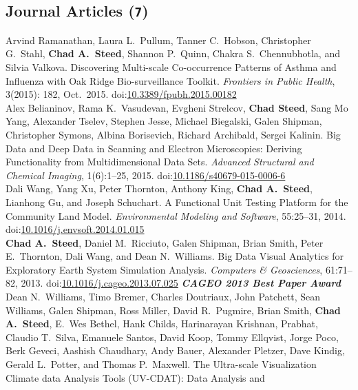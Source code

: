\documentclass[11pt, letterpaper]{article}
\newcommand{\amper}{{\fontspec[Scale=.95]{Hoefler Text}\selectfont\itshape\&}}
\newcommand{\years}[1]{\marginnote{\scriptsize #1}}
\begin{document}
\subsection*{Journal Articles (\texttt{7})}
\begin{sloppypar}
\noindent\years{2015}Arvind Ramanathan, Laura L.\ Pullum, Tanner C.\ Hobson,
Christopher G.\ Stahl, \textbf{Chad A.\ Steed}, Shannon P.\ Quinn,
Chakra S.\ Chennubhotla, and Silvia Valkova.  Discovering Multi-scale
Co-occurrence Patterns of Asthma and Influenza with Oak Ridge Bio-surveillance
Toolkit. \emph{Frontiers in Public Health}, 3(2015): 182, Oct.\ 2015.
doi:\href{http://dx.doi.org/10.3389/fpubh.2015.00182}
{10.3389/fpubh.2015.00182}\\
\years{2015}Alex Belianinov, Rama K.\ Vasudevan, Evgheni Strelcov,
\textbf{Chad Steed}, Sang Mo Yang, Alexander Tselev, Stephen Jesse,
Michael Biegalski, Galen Shipman, Christopher Symons, Albina Borisevich,
Richard Archibald, Sergei Kalinin.  Big Data and Deep Data in Scanning
and Electron Microscopies: Deriving Functionality from Multidimensional Data
Sets. \emph{Advanced Structural and Chemical Imaging}, 1(6):1--25, 2015.
doi:\href{http://dx.doi.org/10.1186/s40679-015-0006-6}
{10.1186/s40679-015-0006-6}\\
\years{2014}Dali Wang, Yang Xu, Peter Thornton, Anthony King,
\textbf{Chad A.\ Steed}, Lianhong Gu, and Joseph Schuchart.
A Functional Unit Testing Platform for the Community Land Model.
\emph{Environmental Modeling and Software}, 55:25--31, 2014.
doi:\href{http://dx.doi.org/10.1016/j.envsoft.2014.01.015}
{10.1016/j.envsoft.2014.01.015}\\
\years{2013}\textbf{Chad A.\ Steed}, Daniel M.\ Ricciuto, Galen Shipman,
Brian Smith, Peter E.\ Thornton, Dali Wang, and Dean N.\ Williams.
Big Data Visual Analytics for Exploratory Earth System Simulation Analysis.
\emph{Computers \amper{} Geosciences}, 61:71--82, 2013.
doi:\href{http://dx.doi.org/10.1016/j.cageo.2013.07.025}
{10.1016/j.cageo.2013.07.025}
\textbf{\emph{CAGEO 2013 Best Paper Award}}\\
\years{2013}Dean N.\ Williams, Timo Bremer, Charles Doutriaux, John Patchett,
Sean Williams, Galen Shipman, Ross Miller, David R.\ Pugmire, Brian Smith,
\textbf{Chad A.\ Steed}, E.\ Wes Bethel, Hank Childs, Harinarayan Krishnan,
Prabhat, Claudio T.\ Silva, Emanuele Santos, David Koop, Tommy Ellqvist,
Jorge Poco, Berk Geveci, Aashish Chaudhary, Andy Bauer, Alexander Pletzer,
Dave Kindig, Gerald L.\ Potter, and Thomas P.\ Maxwell. The Ultra-scale
Visualization Climate data Analysis Tools (UV-CDAT): Data Analysis and

\end{sloppypar}
\end{document}
